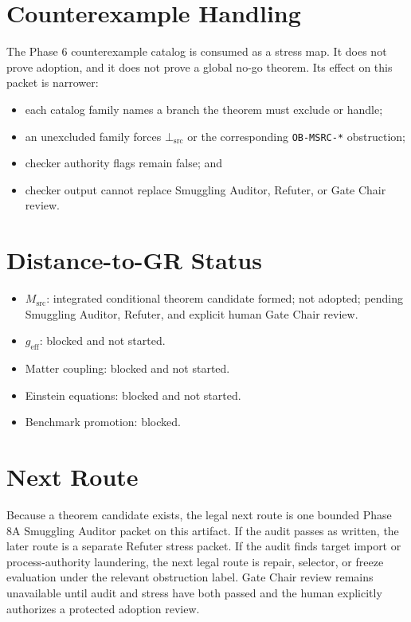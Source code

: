 \documentclass[11pt]{article}
\newcommand{\Msrc}{M_{\mathrm{src}}}
\newcommand{\BottomSrc}{\bot_{\mathrm{src}}}
\begin{document}
\section{Counterexample Handling}

The Phase 6 counterexample catalog is consumed as a stress map. It does not
prove adoption, and it does not prove a global no-go theorem. Its effect on
this packet is narrower:

\begin{itemize}[leftmargin=*]
  \item each catalog family names a branch the theorem must exclude or handle;
  \item an unexcluded family forces \(\BottomSrc\) or the corresponding
  \texttt{OB-MSRC-*} obstruction;
  \item checker authority flags remain false; and
  \item checker output cannot replace Smuggling Auditor, Refuter, or Gate Chair
  review.
\end{itemize}

\section{Distance-to-GR Status}

\begin{itemize}[leftmargin=*]
  \item \(\Msrc\): integrated conditional theorem candidate formed; not
  adopted; pending Smuggling Auditor, Refuter, and explicit human Gate Chair
  review.
  \item \(g_{\mathrm{eff}}\): blocked and not started.
  \item Matter coupling: blocked and not started.
  \item Einstein equations: blocked and not started.
  \item Benchmark promotion: blocked.
\end{itemize}

\section{Next Route}

Because a theorem candidate exists, the legal next route is one bounded Phase
8A Smuggling Auditor packet on this artifact. If the audit passes as written,
the later route is a separate Refuter stress packet. If the audit finds target
import or process-authority laundering, the next legal route is repair,
selector, or freeze evaluation under the relevant obstruction label. Gate Chair
review remains unavailable until audit and stress have both passed and the
human explicitly authorizes a protected adoption review.
\end{document}
